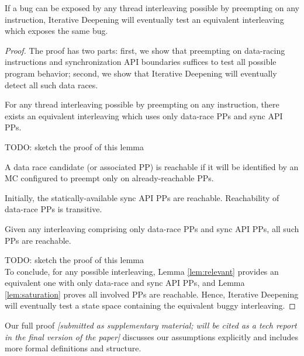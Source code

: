 \begin{theorem}
If a bug can be exposed by any thread interleaving possible by preempting on any instruction,
Iterative Deepening will eventually test an equivalent interleaving which exposes the same bug.
\end{theorem}
\begin{proof}
The proof has two parts:
first, we show that preempting on data-racing instructions and synchronization API boundaries suffices to test all possible program behavior;
second, we show that Iterative Deepening will eventually detect all such data races.

\begin{lemma}
For any thread interleaving possible by preempting on any instruction,
there exists an equivalent interleaving which uses only data-race PPs and sync API PPs.
	\label{lem:relevant}
\end{lemma}

TODO: sketch the proof of this lemma %

\begin{definition}
A data race candidate (or associated PP) is reachable if it will be identified by an MC configured to preempt only on already-reachable PPs.
\end{definition}
Initially, the statically-available sync API PPs are reachable. Reachability of data-race PPs is transitive.
\begin{lemma}
	Given any interleaving comprising only data-race PPs and sync API PPs, all such PPs are reachable.
	\label{lem:saturation}
\end{lemma}

TODO: sketch the proof of this lemma %
\\

To conclude,
for any possible interleaving, Lemma \ref{lem:relevant} provides an equivalent one with only data-race and sync API PPs,
and Lemma \ref{lem:saturation} proves all involved PPs are reachable.
Hence, Iterative Deepening will eventually test a state space containing the equivalent buggy interleaving.
\end{proof}

Our full proof
{\em [submitted as supplementary material; will be cited as a tech report in the final version of the paper]}
discusses our assumptions explicitly and includes more formal definitions and structure.


